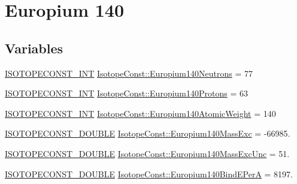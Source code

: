 \hypertarget{group___isotope_const-_europium-_eu140}{}\section{Europium 140}
\label{group___isotope_const-_europium-_eu140}
\subsection*{Variables}
\begin{DoxyCompactItemize}
\item 
\mbox{\hyperlink{group___isotope_const-_macros_ga5f18360b3e99483a35c32d789e62621c}{I\+S\+O\+T\+O\+P\+E\+C\+O\+N\+S\+T\+\_\+\+I\+NT}} \mbox{\hyperlink{group___isotope_const-_europium-_eu140_gaf396a575f54f98e6456dc8ee5ef4ec52}{Isotope\+Const\+::\+Europium140\+Neutrons}} = 77
\item 
\mbox{\hyperlink{group___isotope_const-_macros_ga5f18360b3e99483a35c32d789e62621c}{I\+S\+O\+T\+O\+P\+E\+C\+O\+N\+S\+T\+\_\+\+I\+NT}} \mbox{\hyperlink{group___isotope_const-_europium-_eu140_ga4d0719a7cd5d98a78273aec431c2a808}{Isotope\+Const\+::\+Europium140\+Protons}} = 63
\item 
\mbox{\hyperlink{group___isotope_const-_macros_ga5f18360b3e99483a35c32d789e62621c}{I\+S\+O\+T\+O\+P\+E\+C\+O\+N\+S\+T\+\_\+\+I\+NT}} \mbox{\hyperlink{group___isotope_const-_europium-_eu140_gae77310797a8f972c6ccc8c01fdb8b552}{Isotope\+Const\+::\+Europium140\+Atomic\+Weight}} = 140
\item 
\mbox{\hyperlink{group___isotope_const-_macros_ga8f45a7272ce02c0b4c65c44636ed719a}{I\+S\+O\+T\+O\+P\+E\+C\+O\+N\+S\+T\+\_\+\+D\+O\+U\+B\+LE}} \mbox{\hyperlink{group___isotope_const-_europium-_eu140_ga28b67ff1b73e0e5dfc7f282f36a30bc4}{Isotope\+Const\+::\+Europium140\+Mass\+Exc}} = -\/66985.
\item 
\mbox{\hyperlink{group___isotope_const-_macros_ga8f45a7272ce02c0b4c65c44636ed719a}{I\+S\+O\+T\+O\+P\+E\+C\+O\+N\+S\+T\+\_\+\+D\+O\+U\+B\+LE}} \mbox{\hyperlink{group___isotope_const-_europium-_eu140_ga87eeb53e8c9ed250960928f5bae4b601}{Isotope\+Const\+::\+Europium140\+Mass\+Exc\+Unc}} = 51.
\item 
\mbox{\hyperlink{group___isotope_const-_macros_ga8f45a7272ce02c0b4c65c44636ed719a}{I\+S\+O\+T\+O\+P\+E\+C\+O\+N\+S\+T\+\_\+\+D\+O\+U\+B\+LE}} \mbox{\hyperlink{group___isotope_const-_europium-_eu140_ga37588f4ccd6157a5f6e9841db81ff93e}{Isotope\+Const\+::\+Europium140\+Bind\+E\+PerA}} = 8197.
\item 

\end{DoxyCompactItemize}
